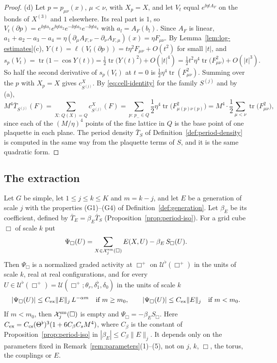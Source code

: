 \begin{proof}
(d) Let $p=p_{\mu\nu}(x)$, $\mu<\nu$, with $X_p=X$, and let $V_t$ equal $e^{\ii\eta tA_F}$ on the bonds of $X^{(3)}$ and $1$ elsewhere. Its real part is $1$, so $V_t(\partial p)=e^{\ii\eta ta_1}e^{\ii\eta ta_2}e^{-\ii\eta ta_3}e^{-\ii\eta ta_4}$ with $a_l=A_F(b_l)$. Since $A_F$ is linear, $a_1+a_2-a_3-a_4=\eta(\partial_\mu A_{F,\nu}-\partial_\nu A_{F,\mu})(x)=\eta F_{\mu\nu}$. By Lemma~\ref{lem:log-estimates}(c), $Y(t)=\ell(V_t(\partial p))=t\eta^2F_{\mu\nu}+O(t^2)$ for small $|t|$, and
\[
s_p(V_t)=\operatorname{tr}\big(1-\cos Y(t)\big)=\tfrac12\operatorname{tr}\big(Y(t)^2\big)+O(|t|^4)=\tfrac12t^2\eta^4\operatorname{tr}\big(F_{\mu\nu}^2\big)+O(|t|^3).
\]
So half the second derivative of $s_p(V_t)$ at $t=0$ is $\frac12\eta^4\operatorname{tr}(F_{\mu\nu}^2)$. Summing over the $p$ with $X_p=X$ gives $c^X_{S^{(j)}}$. By \eqref{eq:cell-identity} for the family $S^{(j)}$ and by (a),
\[
M^4\bar T_{S^{(j)}}(F)=\sum_{X:\,Q(X)=Q}c^X_{S^{(j)}}(F)=\sum_{p:\,p_-\in Q}\frac12\eta^4\operatorname{tr}\big(F_{\mu(p)\nu(p)}^2\big)=M^4\cdot\frac12\sum_{\mu<\nu}\operatorname{tr}\big(F_{\mu\nu}^2\big),
\]
since each of the $(M/\eta)^4$ points of the fine lattice in $Q$ is the base point of one plaquette in each plane. The period density $\bar T_S$ of Definition~\ref{def:period-density} is computed in the same way from the plaquette terms of $S$, and it is the same quadratic form.
\end{proof}

\subsection{The extraction}\label{subsec:extraction-prop}

\begin{proposition}[Extraction]\label{prop:extraction}
Let $G$ be simple, let $1\le j\le k\le K$ and $m=k-j$, and let $E$ be a generation of scale $j$ with the properties (G1)--(G4) of Definition~\ref{def:generation}. Let $\beta_E$ be its coefficient, defined by $\bar T_E=\beta_E\bar T_S$ (Proposition~\ref{prop:period-iso}). For a grid cube $\Box$ of scale $k$ put
\[
\Psi_\Box(U)=\sum_{X\in\mathcal X^{\rm sm}_j(\Box)}E(X,U)-\beta_E\,S_\Box(U).
\]
Then $\Psi_\Box$ is a normalized graded activity at $\Box^+$ on $\mathcal U^\flat(\Box^+)$ in the units of scale $k$, real at real configurations, and for every $U\in\mathcal U^\flat(\Box^+)=\mathcal U(\Box^+;\theta_r,\delta_1^\flat,\delta_0)$ in the units of scale $k$
\[
|\Psi_\Box(U)|\le C_{\rm ex}\|E\|_j\,L^{-\alpha m}\quad\text{if }m\ge m_0,\qquad|\Psi_\Box(U)|\le C_{\rm ex}\|E\|_j\quad\text{if }m<m_0 .
\]
If $m<m_0$, then $\mathcal X^{\rm sm}_j(\Box)$ is empty and $\Psi_\Box=-\beta_ES_\Box$. Here $C_{\rm ex}=C_{\rm cs}(\Theta^\flat)^3(1+6C_\beta C_sM^4)$, where $C_\beta$ is the constant of Proposition~\ref{prop:period-iso} in $|\beta_E|\le C_\beta\|E\|_j$. It depends only on the parameters fixed in Remark~\ref{rem:parameters}(1)--(5), not on $j$, $k$, $\Box$, the torus, the couplings or $E$.
\end{proposition}

